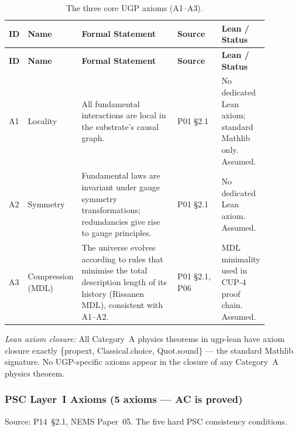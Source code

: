 \begingroup\footnotesize\renewcommand{\arraystretch}{1.2}
\begin{longtable}{@{}P{0.05\linewidth}P{0.13\linewidth}P{0.37\linewidth}P{0.17\linewidth}P{0.16\linewidth}@{}}
\caption{The three core UGP axioms (A1--A3).}
\label{tab:mi-core-axioms}\\
\toprule
\textbf{ID} & \textbf{Name} & \textbf{Formal Statement} &
  \textbf{Source} & \textbf{Lean / Status} \\
\midrule
\endfirsthead
\midrule
\textbf{ID} & \textbf{Name} & \textbf{Formal Statement} &
  \textbf{Source} & \textbf{Lean / Status} \\
\midrule
\endhead
\bottomrule
\endfoot
A1 & Locality & All fundamental interactions are local in the substrate's causal graph. &
  P01 \S2.1 & No dedicated Lean axiom; standard Mathlib only. Assumed. \\
A2 & Symmetry & Fundamental laws are invariant under gauge symmetry transformations;
  redundancies give rise to gauge principles. &
  P01 \S2.1 & No dedicated Lean axiom. Assumed. \\
A3 & Compression (MDL) & The universe evolves according to rules that minimise the total
  description length of its history (Rissanen MDL), consistent with A1--A2. &
  P01 \S2.1, P06 &
  MDL minimality used in CUP-4 proof chain. Assumed. \\
\end{longtable}
\endgroup

\noindent\textit{Lean axiom closure:} All Category~A physics theorems in ugp-lean have
axiom closure exactly \{propext, Classical.choice, Quot.sound\} — the standard Mathlib
signature. No UGP-specific axioms appear in the closure of any Category~A physics theorem.

\subsubsection{PSC Layer~I Axioms (5 axioms — AC is proved)}
\label{sec:mi-psc-layer1}

Source: P14~\S2.1, NEMS Paper~05. The five hard PSC consistency conditions.

